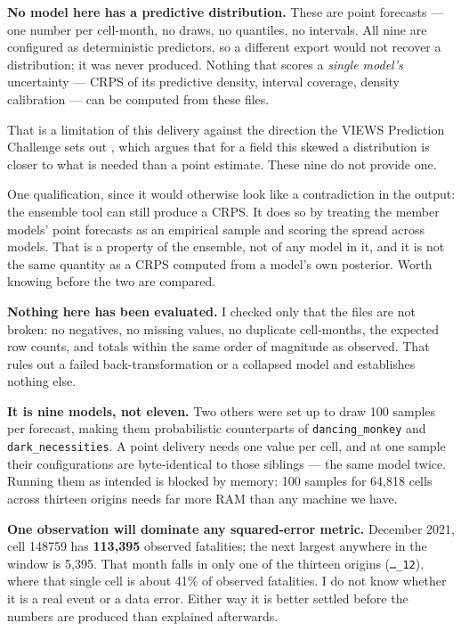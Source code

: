
\textbf{No model here has a predictive distribution.} These are point forecasts --- one number per
cell-month, no draws, no quantiles, no intervals. All nine are configured as deterministic
predictors, so a different export would not recover a distribution; it was never produced. Nothing
that scores a \textit{single model's} uncertainty --- CRPS of its predictive density, interval
coverage, density calibration --- can be computed from these files.

That is a limitation of this delivery against the direction the VIEWS Prediction Challenge sets
out \citep{hegre2025challenge}, which argues that for a field this skewed a distribution is
closer to what is needed than a point estimate. These nine do not provide one.

One qualification, since it would otherwise look like a contradiction in the output: the ensemble
tool can still produce a CRPS. It does so by treating the member models' point forecasts as an
empirical sample and scoring the spread across models. That is a property of the ensemble, not of
any model in it, and it is not the same quantity as a CRPS computed from a model's own posterior.
Worth knowing before the two are compared.

\textbf{Nothing here has been evaluated.} I checked only that the files are not broken: no
negatives, no missing values, no duplicate cell-months, the expected row counts, and totals within
the same order of magnitude as observed. That rules out a failed back-transformation or a collapsed
model and establishes nothing else.

\textbf{It is nine models, not eleven.} Two others were set up to draw 100 samples per forecast,
making them probabilistic counterparts of \texttt{dancing\_monkey} and \texttt{dark\_necessities}.
A point delivery needs one value per cell, and at one sample their configurations are
byte-identical to those siblings --- the same model twice. Running them as intended is blocked by
memory: 100 samples for 64,818 cells across thirteen origins needs far more RAM than any machine we
have.

\textbf{One observation will dominate any squared-error metric.} December 2021, cell 148759 has
\textbf{113,395} observed fatalities; the next largest anywhere in the window is 5,395. That month
falls in only one of the thirteen origins (\texttt{\dots\_12}), where that single cell is about
41\% of observed fatalities. I do not know whether it is a real event or a data error. Either way
it is better settled before the numbers are produced than explained afterwards.

